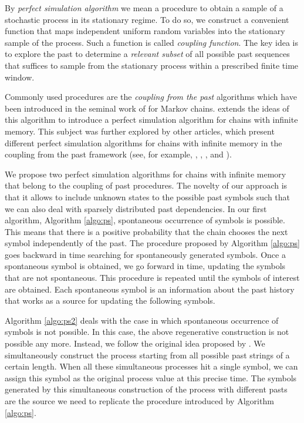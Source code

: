 \documentclass[a4paper]{article}
\begin{document}
By {\it perfect simulation algorithm} we mean a procedure to obtain a sample of a stochastic process in its stationary regime. To do so, we construct a convenient function that maps independent uniform random variables into the stationary sample of the process. Such a  function is called {\it coupling function}. The key idea is to explore the past to determine a {\it relevant subset} of all possible past sequences that suffices to sample from the stationary process within a prescribed finite time window. 

Commonly used procedures are the \textit{coupling from the past} algorithms which have been introduced in the seminal work of \cite{cftp} for Markov chains.  \cite{cff} extends the ideas of this algorithm to introduce a perfect simulation algorithm for chains with infinite memory. This subject was further explored by other articles, which present different perfect simulation algorithms for chains with infinite memory in the coupling from the past framework (see, for example, \cite{gallo}, \cite{desantispiccioni}, \cite{gallogarcia},\cite{gallotakahashi} and \cite{ciftp}).


We propose two perfect simulation algorithms for chains with infinite memory that belong to the coupling of past procedures. The novelty of our approach is that it allows to include unknown states to the possible past symbols such that we can also deal with sparsely distributed past dependencies. In our first algorithm, Algorithm \ref{algo:ps}, spontaneous occurrence of symbols is possible. This means that there is a positive probability that the chain chooses the next symbol independently of the past. The procedure proposed by Algorithm \ref{algo:ps} goes backward in time searching for spontaneously generated symbols. Once a spontaneous symbol is obtained, we go forward in time, updating the symbols that are not spontaneous. This procedure is repeated until the symbols of interest are obtained. Each spontaneous symbol is an information about the past history that works as a source for updating the following symbols.

Algorithm \ref{algo:ps2} deals with the case in which spontaneous occurrence of symbols is not possible. In this case, the above regenerative construction is not possible any more. %
Instead, we follow the original idea proposed by \cite{cftp}. We simultaneously construct the process starting from all possible past strings of a certain length. When all these simultaneous processes hit a single symbol, we can assign this symbol as the original process value at this precise time. The symbols generated by this simultaneous construction of the process with different pasts are the source we need to replicate the procedure introduced by Algorithm \ref{algo:ps}.
\end{document}
